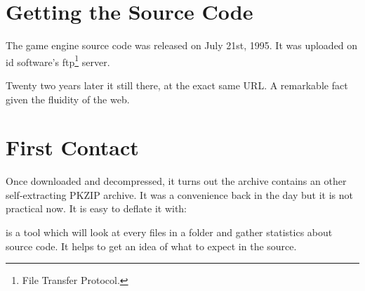 \documentclass[book.tex]{subfiles}
\begin{document}
\section{Getting the Source Code}
The game engine source code was released on July 21st, 1995. It was uploaded on id software's ftp\footnote{File Transfer Protocol.} server.\\ 
\begin{minipage}{\textwidth}

\end{minipage}
\par
Twenty two years later it still there, at the exact same URL. A remarkable fact given the fluidity of the web.\\

\section{First Contact}
Once downloaded and decompressed, it turns out the archive  contains an other self-extracting PKZIP archive. It was a convenience back in the day but it is not practical now. It is easy to deflate it with:\\
\par
\begin{minipage}{\textwidth}

\end{minipage}

\par
{} is a tool which will look at every files in a folder and gather statistics about source code. It helps to get an idea of what to expect in the source.\\
\par

\begin{minipage}{\textwidth}

\end{minipage}
\end{document}
